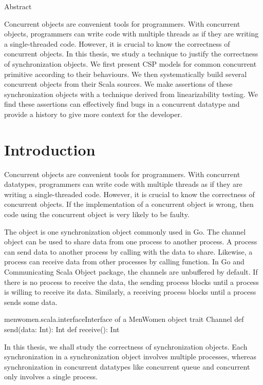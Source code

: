 \documentclass[a4paper, 12pt]{article}
\begin{document}
Abstract

Concurrent objects are convenient tools for programmers. With concurrent objects, programmers can write code with multiple threads as if they are writing a single-threaded code. However, it is crucial to know the correctness of concurrent objects. In this thesis, we study a technique to justify the correctness of synchronization objects. We first present CSP models for common concurrent primitive according to their behaviours. We then systematically build several concurrent objects from their Scala sources. We make assertions of these synchronization objects with a technique derived from linearizability testing. We find these assertions can effectively find bugs in a concurrent datatype and provide a history to give more context for the developer. 

\newpage


\tableofcontents
\newpage

\section{Introduction}
Concurrent objects are convenient tools for programmers. With concurrent datatypes, programmers can write code with multiple threads as if they are writing a single-threaded code. However, it is crucial to know the correctness of concurrent objects. If the implementation of a concurrent object is wrong, then code using the concurrent object is very likely to be faulty. 

The  object is one synchronization object commonly used in Go. The channel object can be used to share data from one process to another process. A process can send data to another process by calling  with the data to share. Likewise, a process can receive data from other processes by calling  function. In Go and Communicating Scala Object package, the channels are unbuffered by default. If there is no process to receive the data, the sending process blocks until a process is willing to receive its data. Similarly, a receiving process blocks until a process sends some data. 

\begin{scalainline}{menwomen.scala.interface}{Interface of a MenWomen object}
trait Channel{
  def send(data: Int): Int
  def receive(): Int
}
\end{scalainline}

In this thesis, we shall study the correctness of synchronization objects. Each synchronization in a synchronization object involves multiple processes, whereas synchronization in concurrent datatypes like concurrent queue and concurrent only involves a single process. 
\end{document}
